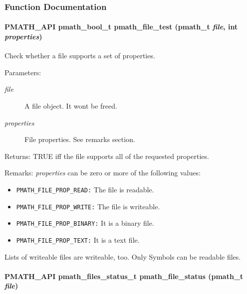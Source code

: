 \subsubsection{Function Documentation}
\hypertarget{group__file__api_gacadb911c98d75248cbcf4fbe5a3237a}{
\paragraph[{pmath\_\-file\_\-test}]{\setlength{\rightskip}{0pt plus 5cm}PMATH\_\-API {\bf pmath\_\-bool\_\-t} pmath\_\-file\_\-test ({\bf pmath\_\-t} {\em file}, \/  int {\em properties})}\hfill}
\label{group__file__api_gacadb911c98d75248cbcf4fbe5a3237a}


Check whether a file supports a set of properties. 

\begin{Desc}
\item[Parameters:]
\begin{description}
\item[{\em file}]A file object. It wont be freed. \item[{\em properties}]File properties. See remarks section. \end{description}
\end{Desc}
\begin{Desc}
\item[Returns:]TRUE iff the file supports all of the requested properties.\end{Desc}
\begin{Desc}
\item[Remarks:]{\em properties\/} can be zero or more of the following values: \begin{itemize}
\item {\tt PMATH\_\-FILE\_\-PROP\_\-READ:} The file is readable.

\item {\tt PMATH\_\-FILE\_\-PROP\_\-WRITE:} The file is writeable.

\item {\tt PMATH\_\-FILE\_\-PROP\_\-BINARY:} It is a binary file.

\item {\tt PMATH\_\-FILE\_\-PROP\_\-TEXT:} It is a text file. \end{itemize}
\end{Desc}
Lists of writeable files are writeable, too. Only Symbols can be readable files. \hypertarget{group__file__api_gc3e849245672e6b61ee1a447218d5ea5}{
\paragraph[{pmath\_\-file\_\-status}]{\setlength{\rightskip}{0pt plus 5cm}PMATH\_\-API {\bf pmath\_\-files\_\-status\_\-t} pmath\_\-file\_\-status ({\bf pmath\_\-t} {\em file})}\hfill}
\label{group__file__api_gc3e849245672e6b61ee1a447218d5ea5}


